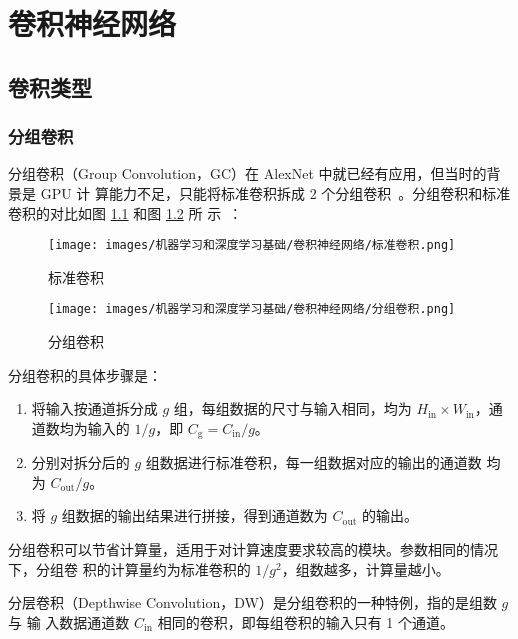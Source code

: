 \chapter{卷积神经网络}

\section{卷积类型}

\subsection{分组卷积}

分组卷积（Group Convolution，GC）在 AlexNet 中就已经有应用，但当时的背景是 GPU 计
算能力不足，只能将标准卷积拆成 2 个分组卷积~。分组卷积和标准
卷积的对比如图 \ref{fig:normal-conv} 和图 \ref{fig:group-conv} 所
示~：

\begin{figure}[ht]
  \centering
  \texttt{[image: images/机器学习和深度学习基础/卷积神经网络/标准卷积.png]}
  \caption{标准卷积}
  \label{fig:normal-conv}
\end{figure}

\begin{figure}[ht]
  \centering
  \texttt{[image: images/机器学习和深度学习基础/卷积神经网络/分组卷积.png]}
  \caption{分组卷积}
  \label{fig:group-conv}
\end{figure}

分组卷积的具体步骤是：

\begin{enumerate}
  \item 将输入按通道拆分成 $g$ 组，每组数据的尺寸与输入相同，均为 $H_{\mathrm{in}}
    \times W_{\mathrm{in}}$，通道数均为输入的 $ 1/g $，即 $
    C_{\mathrm{g}} = C_{\mathrm{in}} / g $。
  \item 分别对拆分后的 $g$ 组数据进行标准卷积，每一组数据对应的输出的通道数
    均为 $ C_{\mathrm{out}}/g $。
  \item 将 $g$ 组数据的输出结果进行拼接，得到通道数为 $C_{\mathrm{out}}$
    的输出。
\end{enumerate}

分组卷积可以节省计算量，适用于对计算速度要求较高的模块。参数相同的情况下，分组卷
积的计算量约为标准卷积的 $ 1 / g^2 $，组数越多，计算量越小。

分层卷积（Depthwise Convolution，DW）是分组卷积的一种特例，指的是组数 $g$ 与 输
入数据通道数 $C_{\mathrm{in}}$ 相同的卷积，即每组卷积的输入只有 1 个通道。


